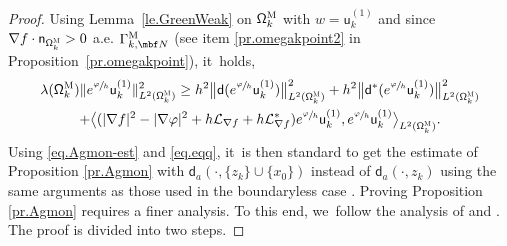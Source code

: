 \begin{proof}
Using Lemma~\ref{le.GreenWeak} on $\mathsf \Omega_k^{\textsc{M}}$ with $w=\mathsf u^{(1)}_k$ and since $\nabla f \cdot \mathsf n_{\mathsf \Omega_k^{\textsc{M}} }> 0$ a.e. $\Gamma_{k, \mbf N}^{\text{M}}$ (see item \eqref{pr.omegakpoint2} in Proposition~\ref{pr.omegakpoint}), it~holds,
\begin{multline} \label{eq.Agmon-est}
\lambda(\mathsf \Omega_k^{\textsc{M}}) \Vert e^{\sfrac{\varphi}{h}} \mathsf u^{(1)}_k \Vert_{ L^{2} (\mathsf \Omega_k^{\textsc{M}})}^2\ge
h^{2}\big \| \mathsf d (e^{\sfrac{\varphi}{h}} \mathsf u^{(1)}_k)\big \|^{2}_{ L^{2} (\mathsf \Omega_k^{\textsc{M}})}+
h^{2} \big \| \mathsf d^{*} (e^{\sfrac{\varphi}{h}} \mathsf u^{(1)}_k) \big \|^{2}_{ L^{2} (\mathsf \Omega_k^{\textsc{M}})}\\
+ \big \langle
(|\nabla f|^{2}-|\nabla \varphi|^{2}+h\mathcal{L}_{\nabla
f}+h\mathcal{L}_{\nabla
f}^{*})e^{\sfrac{\varphi}{h}} \mathsf u^{(1)}_k, e^{\sfrac{\varphi}{h}}
\mathsf u^{(1)}_k\big \rangle_{ L^{2} (\mathsf \Omega_k^{\textsc{M}})}.
\end{multline}
Using \eqref{eq.Agmon-est} and \eqref{eq.eqq}, it~is then standard to get the estimate of Proposition \ref{pr.Agmon} with $\mathsf d_a(\cdot,\{z_k\}\cup \{x_0\})$ instead of $\mathsf d_a(\cdot,z_k)$ using the same arguments as those used in the boundaryless case \cite[Prop.\,3.3.1]{helffer-88}. Proving Proposition \ref{pr.Agmon} requires a finer analysis. To this end, we~follow the analysis of \cite[\S2.2]{HelSjII} and \cite[\S6.c]{DiSj}.
The proof is divided into two steps.


\end{proof}
